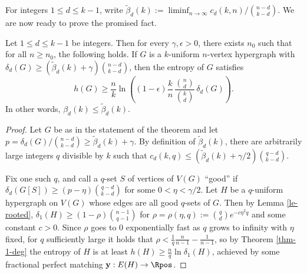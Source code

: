 \documentclass[11pt]{article}
\newcommand{\fpmy}{\mathbf{y}}
\newcommand{\ctinf}{\tilde{\beta}_d(k)}
\begin{document}
For integers $1\le d\le k-1$, write $\ctinf:= \liminf_{n\to\infty} c_d(k,n)/\binom{n-d}{k-d}$. We are now ready to prove the promised fact.

\begin{theorem}
    Let $1\le d\le k-1$ be integers. Then for every $\gamma,\epsilon>0$, there exists $n_0$ such that for all $n\ge n_0$, the following holds. If $G$ is a $k$-uniform $n$-vertex hypergraph with $\delta_d(G)\ge (\ctinf+\gamma)\binom{n-d}{k-d}$, then the entropy of $G$ satisfies
    $$h(G)\ge \frac{n}{k}\ln\left((1-\epsilon)\frac{k}{n}\,\frac{\binom{n}{d}}{\binom{k}{d}}\,\delta_d(G)\right).$$
    In other words, $\beta_d(k)\le\ctinf$.
\end{theorem}

\begin{proof}
    Let $G$ be as in the statement of the theorem and let $p=\delta_d(G)/\binom{n-d}{k-d}\ge \ctinf+\gamma$. By definition of $\ctinf$, there are arbitrarily large integers $q$ divisible by $k$ such that $c_d(k,q)\le (\ctinf+\gamma/2)\binom{q-d}{k-d}$.
    
    Fix one such $q$, and call a $q$-set $S$ of vertices of $V(G)$ ``good'' if $\delta_d(G[S])\ge (p-\eta)\binom{q-d}{k-d}$ for some $0<\eta<\gamma/2$. Let $H$ be a $q$-uniform hypergraph on $V(G)$ whose edges are all good $q$-sets of $G$. Then by Lemma \ref{le-rooted}, $\delta_1(H)\ge (1-\rho)\binom{n-1}{q-1}$ for $\rho=\rho(\eta,q):=\binom{q}{d}e^{-c\eta^2q}$ and some constant $c>0$. Since $\rho$ goes to $0$ exponentially fast as $q$ grows to infinity with $\eta$ fixed, for $q$ sufficiently large it holds that $\rho<\frac{1}{q}\frac{n}{n-1}-\frac{1}{n-1}$, so by Theorem \ref{thm-1-deg} the entropy of $H$ is at least $h(H)\ge \frac{n }{q }\ln\delta_1(H)$, achieved by some fractional perfect matching $\fpmy:E(H)\to\Rpos$.


\end{proof}
\end{document}
